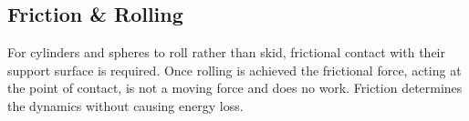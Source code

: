 \subsection{Friction \& Rolling}
For cylinders and spheres to roll rather than skid, frictional contact with their support surface is required.  Once rolling is achieved the frictional force, acting at the point of contact, is not a moving force and does no work.  Friction determines the dynamics without causing energy loss.\\


